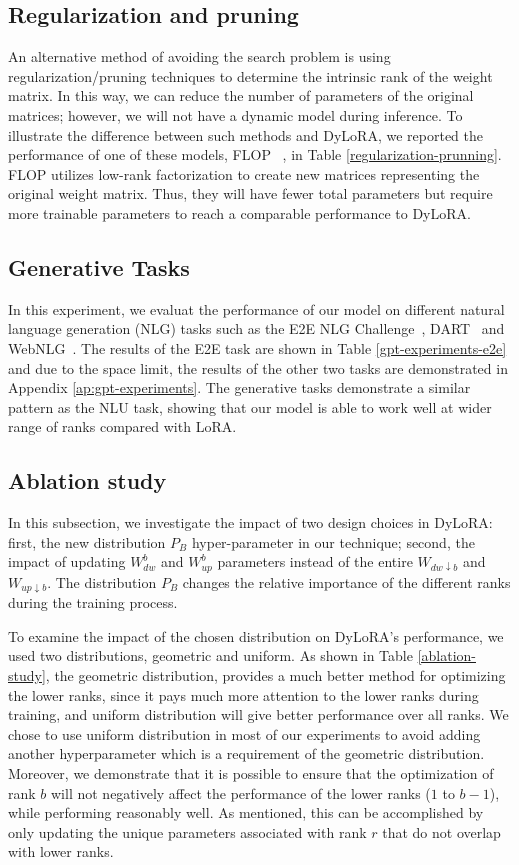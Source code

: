 \subsection{Regularization and pruning} 

An alternative method of avoiding the search problem is using regularization/pruning techniques to determine the intrinsic rank of the weight matrix. In this way, we can reduce the number of parameters of the original matrices; however, we will not have a dynamic model during inference. To illustrate the difference between such methods and DyLoRA, we reported the performance of one of these models, FLOP ~\cite{wang2019structured}, in Table \ref{regularization-prunning}. FLOP utilizes low-rank factorization to create new matrices representing the original weight matrix. Thus, they will have fewer total parameters but require more trainable parameters to reach a comparable performance to DyLoRA. 

\subsection{Generative Tasks} In this experiment, we evaluat the performance of our model on different natural language generation (NLG) tasks such as the E2E NLG Challenge~\cite{novikova2017e2e}, DART~\cite{nan2020dart} and WebNLG~\cite{gardent2017webnlg}. The results of the E2E task are shown in Table \ref{gpt-experiments-e2e} and due to the space limit, the results of the other two tasks are demonstrated in Appendix \ref{ap:gpt-experiments}. The generative tasks demonstrate a similar pattern as the NLU task, showing that our model is able to work well at wider range of ranks compared with LoRA. 

\subsection{Ablation study} 

In this subsection, we investigate the impact of two design choices in DyLoRA: first, the new distribution $P_B$ hyper-parameter in our technique; second, the impact of updating $W_{dw}^b$ and $W_{up}^b$ parameters instead of the entire $W_{dw \downarrow b}$ and $W_{up \downarrow b}$. The distribution $P_B$ changes the relative importance of the different ranks during the training process.  

To examine the impact of the chosen distribution on DyLoRA's performance, we used two distributions, geometric and uniform. As shown in Table \ref{ablation-study}, the geometric distribution, provides a much better method for optimizing the lower ranks, since it pays much more attention to the lower ranks during training, and uniform distribution will give better performance over all ranks. We chose to use uniform distribution in most of our experiments to avoid adding another hyperparameter which is a requirement of the geometric distribution. Moreover, we demonstrate that it is possible to ensure that the optimization of rank $b$ will not negatively affect the performance of the lower ranks ($1$ to $b-1$), while performing reasonably well. As mentioned, this can be accomplished by only updating the unique parameters associated with rank $r$ that do not overlap with lower ranks. 

